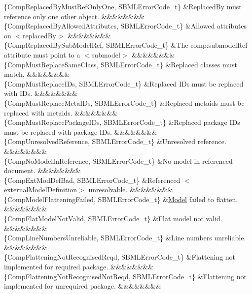 \begin{DoxyParagraph}{}
\begin{longtabu}
\{Comp\+Replaced\+By\+Must\+Ref\+Only\+One, S\+B\+M\+L\+Error\+Code\+\_\+t\} &Replaced\+By must reference only one other object. &&&&&&&&\\
\{Comp\+Replaced\+By\+Allowed\+Attributes, S\+B\+M\+L\+Error\+Code\+\_\+t\} &Allowed attributes on {\ttfamily $<$replaced\+By$>$} &&&&&&&&\\
\{Comp\+Replaced\+By\+Sub\+Model\+Ref, S\+B\+M\+L\+Error\+Code\+\_\+t\} &The \textquotesingle{}comp\+:submodel\+Ref\textquotesingle{} attribute must point to a {\ttfamily $<$submodel$>$} &&&&&&&&\\
\{Comp\+Must\+Replace\+Same\+Class, S\+B\+M\+L\+Error\+Code\+\_\+t\} &Replaced classes must match. &&&&&&&&\\
\{Comp\+Must\+Replace\+I\+Ds, S\+B\+M\+L\+Error\+Code\+\_\+t\} &Replaced I\+Ds must be replaced with I\+Ds. &&&&&&&&\\
\{Comp\+Must\+Replace\+Meta\+I\+Ds, S\+B\+M\+L\+Error\+Code\+\_\+t\} &Replaced metaids must be replaced with metaids. &&&&&&&&\\
\{Comp\+Must\+Replace\+Package\+I\+Ds, S\+B\+M\+L\+Error\+Code\+\_\+t\} &Replaced package I\+Ds must be replaced with package I\+Ds. &&&&&&&&\\
\{Comp\+Unresolved\+Reference, S\+B\+M\+L\+Error\+Code\+\_\+t\} &Unresolved reference. &&&&&&&&\\
\{Comp\+No\+Model\+In\+Reference, S\+B\+M\+L\+Error\+Code\+\_\+t\} &No model in referenced document. &&&&&&&&\\
\{Comp\+Ext\+Mod\+Def\+Bad, S\+B\+M\+L\+Error\+Code\+\_\+t\} &Referenced {\ttfamily $<$external\+Model\+Definition$>$} unresolvable. &&&&&&&&\\
\{Comp\+Model\+Flattening\+Failed, S\+B\+M\+L\+Error\+Code\+\_\+t\} &\hyperlink{class_model}{Model} failed to flatten. &&&&&&&&\\
\{Comp\+Flat\+Model\+Not\+Valid, S\+B\+M\+L\+Error\+Code\+\_\+t\} &Flat model not valid. &&&&&&&&\\
\{Comp\+Line\+Numbers\+Unreliable, S\+B\+M\+L\+Error\+Code\+\_\+t\} &Line numbers unreliable. &&&&&&&&\\
\{Comp\+Flattening\+Not\+Recognised\+Reqd, S\+B\+M\+L\+Error\+Code\+\_\+t\} &Flattening not implemented for required package. &&&&&&&&\\
\{Comp\+Flattening\+Not\+Recognised\+Not\+Reqd, S\+B\+M\+L\+Error\+Code\+\_\+t\} &Flattening not implemented for unrequired package. &&&&&&&&\\

\end{longtabu}
\end{DoxyParagraph}
